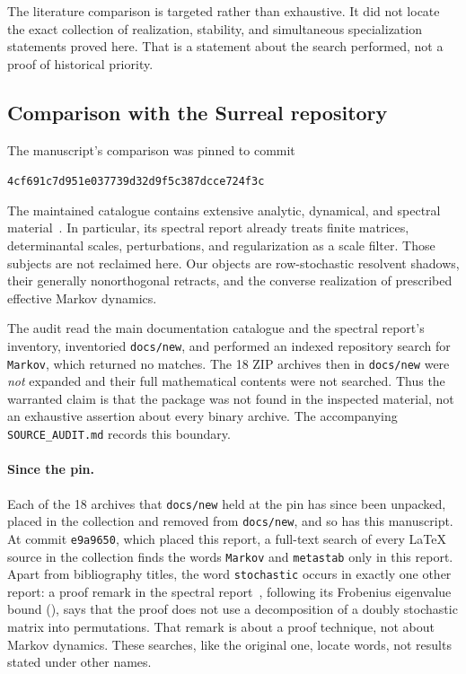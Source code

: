 \documentclass[11pt]{article}
\numberwithin{equation}{section}
\theoremstyle{definition}
\theoremstyle{remark}
\newcommand{\revsha}{\texttt{4cf691c7d951e037739d32d9f5c387dcce724f3c}}
\begin{document}
The literature comparison is targeted rather than exhaustive. It did not locate
the exact collection of realization, stability, and simultaneous specialization
statements proved here. That is a statement about the search performed, not a
proof of historical priority.

\subsection{Comparison with the Surreal repository}\label{markov:sec:comparison}

The manuscript's comparison was pinned to commit
\begin{center}\small\revsha\end{center}
The maintained catalogue contains extensive analytic, dynamical, and spectral
material~\cite{Repo}. In particular, its spectral report already treats finite
matrices, determinantal scales, perturbations, and regularization as a scale
filter. Those subjects are not reclaimed here. Our objects are row-stochastic
resolvent shadows, their generally nonorthogonal retracts, and the converse
realization of prescribed effective Markov dynamics.

The audit read the main documentation catalogue and the spectral report's
inventory, inventoried \texttt{docs/new}, and performed an indexed repository
search for \texttt{Markov}, which returned no matches. The 18 ZIP archives then in
\texttt{docs/new} were \emph{not} expanded and their full mathematical contents
were not searched. Thus the warranted claim is that the package was not found
in the inspected material, not an exhaustive assertion about every binary
archive. The accompanying \texttt{SOURCE\_AUDIT.md} records this boundary.

\paragraph{Since the pin.}
Each of the 18 archives that \texttt{docs/new} held at the pin has since been
unpacked, placed in the collection and removed from \texttt{docs/new}, and so
has this manuscript. At commit \texttt{e9a9650}, which placed this report, a
full-text search of every LaTeX source in the collection finds the words
\texttt{Markov} and \texttt{metastab} only in this report. Apart from
bibliography titles, the word \texttt{stochastic} occurs in exactly one other
report: a proof remark in the spectral report~\cite{CollSpec}, following its
Frobenius eigenvalue bound (), says that the proof does not use a
decomposition of a doubly stochastic matrix into permutations. That remark is
about a proof technique, not about Markov dynamics. These searches, like the
original one, locate words, not results stated under other names.
\end{document}
